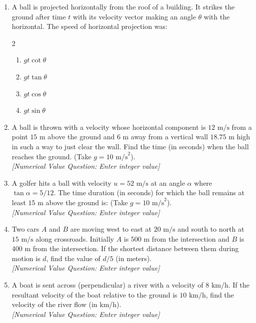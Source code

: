\documentclass[11pt,a4paper]{article}
\begin{document}
\begin{enumerate}[label=\textbf{\textcolor{l3Crimson}{Q\arabic*.}},leftmargin=24pt,itemsep=10pt,start=51]
  \item A ball is projected horizontally from the roof of a building. It strikes the ground after time $t$ with its velocity vector making an angle $\theta$ with the horizontal. The speed of horizontal projection was:
  \begin{multicols}{2}
  \begin{enumerate}[label=\textbf{\textcolor{primaryDark}{(\Alph*)}},itemsep=2pt]
    \item $gt\cot\theta$
    \item $gt\tan\theta$
    \item $gt\cos\theta$
    \item $gt\sin\theta$
  \end{enumerate}
  \end{multicols}

  \item A ball is thrown with a velocity whose horizontal component is $12\text{ m/s}$ from a point $15\text{ m}$ above the ground and $6\text{ m}$ away from a vertical wall $18.75\text{ m}$ high in such a way to just clear the wall. Find the time (in seconds) when the ball reaches the ground. (Take $g = 10\text{ m/s}^2$).\\
  \textit{[Numerical Value Question: Enter integer value]}

  \item A golfer hits a ball with velocity $u = 52\text{ m/s}$ at an angle $\alpha$ where $\tan\alpha = 5/12$. The time duration (in seconds) for which the ball remains at least $15\text{ m}$ above the ground is: (Take $g = 10\text{ m/s}^2$).\\
  \textit{[Numerical Value Question: Enter integer value]}

  \item Two cars $A$ and $B$ are moving west to east at $20\text{ m/s}$ and south to north at $15\text{ m/s}$ along crossroads. Initially $A$ is $500\text{ m}$ from the intersection and $B$ is $400\text{ m}$ from the intersection. If the shortest distance between them during motion is $d$, find the value of $d / 5$ (in meters).\\
  \textit{[Numerical Value Question: Enter integer value]}

  \item A boat is sent across (perpendicular) a river with a velocity of $8\text{ km/h}$. If the resultant velocity of the boat relative to the ground is $10\text{ km/h}$, find the velocity of the river flow (in km/h).\\
  \textit{[Numerical Value Question: Enter integer value]}


\end{enumerate}
\end{document}
